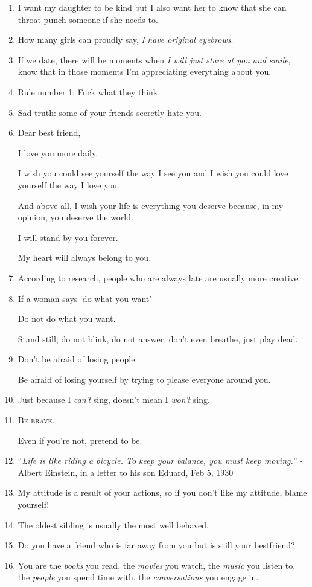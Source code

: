 \documentclass{article}
\numberwithin{equation}{section}
\begin{document}
\begin{enumerate}
    Not everyone will stay forever.
    \item I want my daughter to be kind but I also want her to know that she can throat punch someone if she needs to.
    \item How many girls can proudly say, \textit{I have original eyebrows}.
    \item If we date, there will be moments when \textit{I will just stare at you and smile}, know that in those moments I'm appreciating everything about you.
    \item Rule number 1: Fuck what they think.
    \item Sad truth: some of your friends secretly hate you.
    \item Dear best friend,
    
    I love you more daily.
    
    I wish you could see yourself the way I see you and I wish you could love yourself the way I love you.
    
    And above all, I wish your life is everything you deserve because, in my opinion, you deserve the world.
    
    I will stand by you forever.
    
    My heart will always belong to you.
    \item According to research, people who are always late are usually more creative.
    \item If a woman says `do what you want'
    
    Do not do what you want.
    
    Stand still, do not blink, do not answer, don't even breathe, just play dead.
    \item Don't be afraid of losing people.
    
    Be afraid of losing yourself by trying to please everyone around you.
    \item Just because I \textit{can't} sing, doesn't mean I \textit{won't} sing.
    \item \textsc{Be brave}.
    
    Even if you're not, pretend to be.
    \item ``\textit{Life is like riding a bicycle. To keep your balance, you must keep moving.}'' - Albert Einstein, in a letter to his son Eduard, Feb 5, 1930
    \item My attitude is a result of your actions, so if you don't like my attitude, blame yourself!
    \item The oldest sibling is usually the most well behaved.
    \item Do you have a friend who is far away from you but is still your bestfriend?
    \item You are the \textit{books} you read, the \textit{movies} you watch, the \textit{music} you listen to, the \textit{people} you spend time with, the \textit{conversations} you engage in.
    

\end{enumerate}
\end{document}

